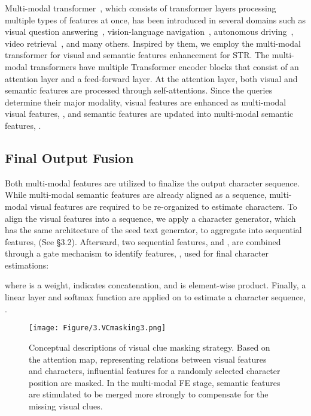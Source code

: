 \documentclass[runningheads]{llncs}
\begin{document}
Multi-modal transformer~\cite{tsai2019MULT_MT}, which consists of transformer layers processing multiple types of features at once, has been introduced in several domains such as visual question answering~\cite{hu2020iterative_M4C}, vision-language navigation~\cite{chen2021hamt_VLN}, autonomous driving~\cite{prakash2021multi}, video retrieval~\cite{gabeur2020multi_VR}, and many others. Inspired by them, we employ the multi-modal transformer for visual and semantic features enhancement for STR. The multi-modal transformers have multiple Transformer encoder blocks that consist of an attention layer and a feed-forward layer. At the attention layer, both visual and semantic features are processed through self-attentions. Since the queries determine their major modality, visual features are enhanced as multi-modal visual features, , and semantic features are updated into multi-modal semantic features, . 


\subsection{Final Output Fusion}

Both multi-modal features are utilized to finalize the output character sequence. While multi-modal semantic features are already aligned as a sequence, multi-modal visual features are required to be re-organized to estimate characters. To align the visual features into a sequence, we apply a character generator, which has the same architecture of the seed text generator, to aggregate  into sequential features,  (See \S3.2). Afterward, two sequential features,  and , are combined through a gate mechanism to identify features, , used for final character estimations:

where  is a weight,  indicates concatenation, and  is element-wise product. Finally, a linear layer and softmax function are applied on  to estimate a character sequence, . 


\begin{figure}[t]
    \centering
    \texttt{[image: Figure/3.VCmasking3.png]}
    \caption{Conceptual descriptions of visual clue masking strategy. Based on the attention map, representing relations between visual features and characters, influential features for a randomly selected character position are masked. In the multi-modal FE stage, semantic features are stimulated to be merged more strongly to compensate for the missing visual clues.}
    \label{fig:Masking}
\end{figure}
\end{document}
